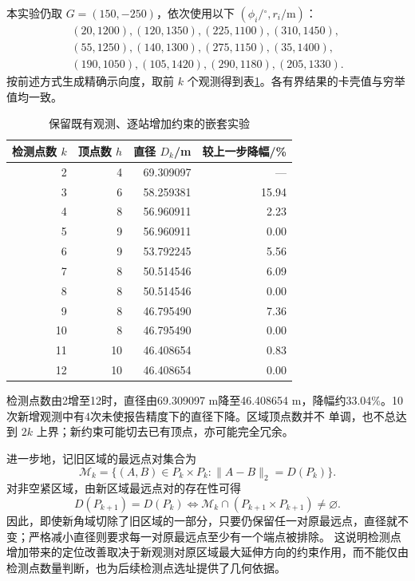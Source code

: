 本实验仍取 $G=(150,-250)$，依次使用以下 $(\phi_i/{}^\circ,r_i/\mathrm m)$：
\begin{equation*}
\begin{gathered}
(20,1200),(120,1350),(225,1100),(310,1450),\\
(55,1250),(140,1300),(275,1150),(35,1400),\\
(190,1050),(105,1420),(290,1180),(205,1330).
\end{gathered}
\end{equation*}
按前述方式生成精确示向度，取前 $k$ 个观测得到表\ref{tab:p1-nested}。各有界结果的卡壳值与穷举值均一致。

\begin{table}[H]
\centering
\caption{保留既有观测、逐站增加约束的嵌套实验}\label{tab:p1-nested}
\begin{tabular}{rrrr}
\toprule
检测点数 $k$ & 顶点数 $h$ & 直径 $D_k$/m & 较上一步降幅/\%\\
\midrule
2 & 4 & 69.309097 & ---\\
3 & 6 & 58.259381 & 15.94\\
4 & 8 & 56.960911 & 2.23\\
5 & 9 & 56.960911 & 0.00\\
6 & 9 & 53.792245 & 5.56\\
7 & 8 & 50.514546 & 6.09\\
8 & 8 & 50.514546 & 0.00\\
9 & 8 & 46.795490 & 7.36\\
10 & 8 & 46.795490 & 0.00\\
11 & 10 & 46.408654 & 0.83\\
12 & 10 & 46.408654 & 0.00\\
\bottomrule
\end{tabular}
\end{table}

检测点数由2增至12时，直径由69.309097 m降至46.408654 m，降幅约33.04\%。10次新增观测中有4次未使报告精度下的直径下降。区域顶点数并不
单调，也不总达到 $2k$ 上界；新约束可能切去已有顶点，亦可能完全冗余。

进一步地，记旧区域的最远点对集合为
\begin{equation*}
\mathcal M_k=\{(A,B)\in P_k\times P_k:\|A-B\|_2=D(P_k)\}.
\end{equation*}
对非空紧区域，由新区域最远点对的存在性可得
\begin{equation}
D(P_{k+1})=D(P_k)
\iff \mathcal M_k\cap(P_{k+1}\times P_{k+1})\ne\varnothing.
\end{equation}
因此，即使新角域切除了旧区域的一部分，只要仍保留任一对原最远点，直径就不变；严格减小直径则要求每一对原最远点至少有一个端点被排除。
这说明检测点增加带来的定位改善取决于新观测对原区域最大延伸方向的约束作用，而不能仅由检测点数量判断，也为后续检测点选址提供了几何依据。
